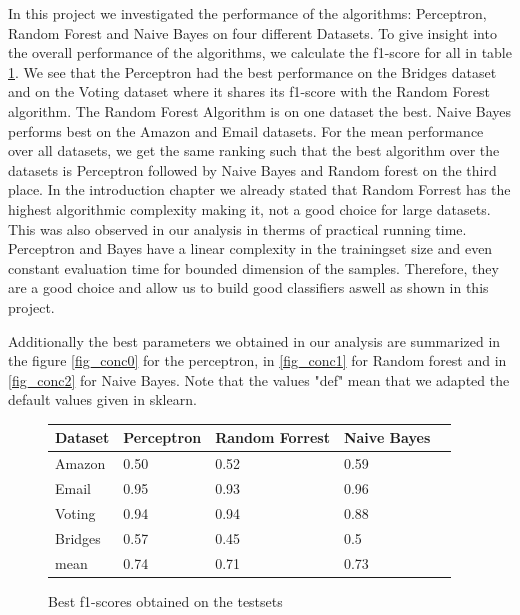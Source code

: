 \documentclass[11pt]{article}
\begin{document}
In this project we investigated the performance of the algorithms: Perceptron, Random Forest and Naive Bayes on four different Datasets. To give insight into the overall performance of the algorithms, we calculate the f1-score for all in table \ref{tab_conc0}. We see that the Perceptron had the best performance on the Bridges dataset and on the Voting dataset where it shares its f1-score with the Random Forest algorithm. The Random Forest Algorithm is on one dataset the best. Naive Bayes performs best on the Amazon and Email datasets. For the mean performance over all datasets, we get the same ranking such that the best algorithm over the datasets is Perceptron followed by Naive Bayes and Random forest on the third place. In the introduction chapter we already stated that Random Forrest has the highest algorithmic complexity making it, not a good choice for large datasets. This was also observed in our analysis in therms of practical running time. Perceptron and Bayes have a linear complexity in the trainingset size and even constant evaluation time for bounded dimension of the samples. Therefore, they are a good choice and allow us to build good classifiers aswell as shown in this project.

Additionally the best parameters we obtained in our analysis are summarized in the figure \ref{fig_conc0} for the perceptron, in \ref{fig_conc1} for Random forest and in \ref{fig_conc2} for Naive Bayes. Note that the values "def" mean that we adapted the default values given in sklearn.  

\begin{figure}[h]
\center
  \begin{tabular}{ | l | l | l | l | l |}
    \hline
    Dataset & Perceptron & Random Forrest  & Naive Bayes \\ \hline
    Amazon  & 0.50			   		 		 & 0.52\cellcolor{gray!25}   	 	   & 0.59\cellcolor{gray!50} \\ \hline
	Email   & 0.95\cellcolor{gray!25}  	 	 & 0.93   		   					   & 0.96\cellcolor{gray!50} \\ \hline
	Voting  & 0.94\cellcolor{gray!50}  	 	 & 0.94\cellcolor{gray!50}   		   & 0.88 	     		     \\ \hline
	Bridges & 0.57\cellcolor{gray!50}  	 	 & 0.45   		   					   & 0.5\cellcolor{gray!25}  \\ \hline
	mean    & 0.74\cellcolor{gray!50}  	 	 & 0.71   		   					   & 0.73\cellcolor{gray!25}  \\ \hline
  \end{tabular}
  \caption{Best f1-scores obtained on the testsets}
  \label{tab_conc0}
\end{figure}
\end{document}
